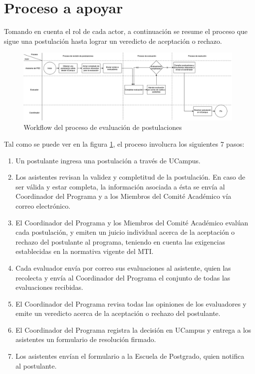 \section{Proceso a apoyar}

Tomando en cuenta el rol de cada actor, a continuación se resume el proceso que
sigue una postulación hasta lograr un veredicto de aceptación o rechazo.

\begin{figure}[!ht]
    \begin{center}
        \includegraphics[scale=0.3]{imagenes/01-workflow-legado.png}
    \end{center}
    \caption{Workflow del proceso de evaluación de postulaciones}
    \label{workflow-legado}
\end{figure}

Tal como se puede ver en la figura \ref{workflow-legado}, el proceso involucra
los siguientes 7 pasos:

\begin{enumerate}
    \item Un postulante ingresa una postulación a través de UCampus.
    \item Los asistentes revisan la validez y completitud de la postulación. En
    caso de ser válida y estar completa, la información asociada a ésta se envía
    al Coordinador del Programa y a los Miembros del Comité Académico vía correo
    electrónico.
    \item El Coordinador del Programa y los Miembros del Comité Académico
    evalúan cada postulación, y emiten un juicio individual acerca de la
    aceptación o rechazo del postulante al programa, teniendo en cuenta las
    exigencias establecidas en la normativa vigente del MTI.
    \item Cada evaluador envía por correo sus evaluaciones al asistente, quien
    las recolecta y envía al Coordinador del Programa el conjunto de todas las
    evaluaciones recibidas.
    \item El Coordinador del Programa revisa todas las opiniones de los
    evaluadores y emite un veredicto acerca de la aceptación o rechazo del
    postulante.
    \item El Coordinador del Programa registra la decisión en UCampus y entrega
    a los asistentes un formulario de resolución firmado.
    \item Los asistentes envían el formulario a la Escuela de Postgrado, quien
    notifica al postulante.
\end{enumerate}

